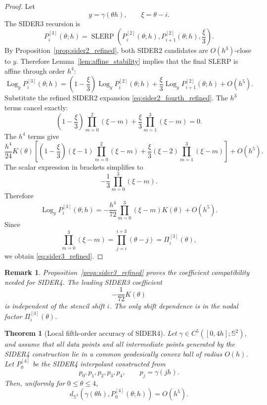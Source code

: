 \documentclass[a4paper,11pt]{article}
\newcommand{\bS}{\mathbb{S}}
\newcommand{\Log}{\operatorname{Log}}
\newcommand{\SLERP}{\operatorname{SLERP}}
\newtheorem{thm}{Theorem}
\newtheorem{remark}{Remark}
\numberwithin{equation}{section}
\begin{document}
\begin{proof}
Let
\[
        y=\gamma(\theta h),
        \qquad
        \xi=\theta-i.
\]
The SIDER3 recursion is
\[
        P_i^{[3]}(\theta;h)
        =
        \SLERP\left(
        P_i^{[2]}(\theta;h),
        P_{i+1}^{[2]}(\theta;h),
        \frac{\xi}{3}
        \right).
\]
By Proposition~\ref{prop:sider2_refined}, both SIDER2 candidates are
\(O(h^3)\)-close to \(y\).  Therefore Lemma~\ref{lem:affine_stability} implies
that the final SLERP is affine through order \(h^4\):
\[
\Log_y P_i^{[3]}(\theta;h)
=
\left(1-\frac{\xi}{3}\right)
\Log_yP_i^{[2]}(\theta;h)
+
\frac{\xi}{3}
\Log_yP_{i+1}^{[2]}(\theta;h)
+
O(h^5).
\]
Substitute the refined SIDER2 expansion
\eqref{eq:sider2_fourth_refined}.  The \(h^3\) terms cancel exactly:
\[
\left(1-\frac{\xi}{3}\right)
\prod_{m=0}^{2}(\xi-m)
+
\frac{\xi}{3}
\prod_{m=1}^{3}(\xi-m)
=0.
\]
The \(h^4\) terms give
\[
\frac{h^4}{24}K(\theta)
\left[
\left(1-\frac{\xi}{3}\right)
(\xi-1)\prod_{m=0}^{2}(\xi-m)
+
\frac{\xi}{3}
(\xi-2)\prod_{m=1}^{3}(\xi-m)
\right]
+
O(h^5).
\]
The scalar expression in brackets simplifies to
\[
        -\frac13
        \prod_{m=0}^{3}(\xi-m).
\]
Therefore
\[
\Log_yP_i^{[3]}(\theta;h)
=
-\frac{h^4}{72}
\prod_{m=0}^{3}(\xi-m)K(\theta)
+
O(h^5).
\]
Since
\[
        \prod_{m=0}^{3}(\xi-m)
        =
        \prod_{j=i}^{i+3}(\theta-j)
        =
        \Pi_i^{[3]}(\theta),
\]
we obtain \eqref{eq:sider3_refined}.
\end{proof}

\begin{remark}
Proposition~\ref{prop:sider3_refined} proves the coefficient compatibility
needed for SIDER4.  The leading SIDER3 coefficient
\[
        -\frac1{72}K(\theta)
\]
is independent of the stencil shift \(i\).  The only shift dependence is in
the nodal factor \(\Pi_i^{[3]}(\theta)\).
\end{remark}

\begin{thm}[Local fifth-order accuracy of SIDER4]
\label{thm:sider4}
Let \(\gamma\in C^5([0,4h];\bS^2)\), and assume that all data points and all
intermediate points generated by the SIDER4 construction lie in a common
geodesically convex ball of radius \(O(h)\).  Let \(P_0^{[4]}\) be the SIDER4
interpolant constructed from
\[
        p_0,p_1,p_2,p_3,p_4,
        \qquad
        p_j=\gamma(jh).
\]
Then, uniformly for \(0\leq\theta\leq4\),
\[
        d_{\bS^2}
        \left(
        \gamma(\theta h),P_0^{[4]}(\theta;h)
        \right)
        =
        O(h^5).
\]
\end{thm}
\end{document}
